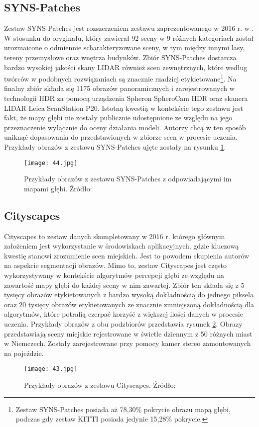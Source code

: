 \subsection{SYNS-Patches}
Zestaw SYNS-Patches \cite{spencer2022deconstructing} jest rozszerzeniem zestawu zaprezentowanego w 2016 r. w \cite{adams2016syns}. W stosunku do oryginału, który zawierał 92 sceny w 9 różnych kategoriach został urozmaicone o odmiennie scharakteryzowane sceny, w tym między innymi lasy, tereny przemysłowe oraz wnętrza budynków. Zbiór SYNS-Patches dostarcza bardzo wysokiej jakości skany LIDAR również scen zewnętrznych, które według twórców w podobnych rozwiązaniach są znacznie rzadziej etykietowane\footnote{Zestaw SYNS-Patches posiada aż 78,30\% pokrycie obrazu mapą głębi, podczas gdy zestaw KITTI posiada jedynie 15,28\% pokrycie.}. Na finalny zbiór składa się 1175 obrazów panoramicznych i zarejestrowanych w technologii HDR za pomocą urządzenia Spheron SpheroCam HDR oraz skanera LIDAR Leica ScanStation P20. Istotną kwestią w kontekście tego zestawu jest fakt, że mapy głębi nie zostały publicznie udostępnione ze względu na jego przeznaczenie wyłącznie do oceny działania modeli. Autorzy chcą w ten sposób uniknąć dopasowania do przedstawionych w zbiorze scen w procesie uczenia. Przykłady obrazów z zestawu SYNS-Patches ujęte zostały na rysunku \ref{fig:syns-example}.
\begin{figure}[H]
    \centering
    \texttt{[image: 44.jpg]}
    \caption{Przykłady obrazów z zestawu SYNS-Patches z odpowiadającymi im mapami głębi. Źródło: \cite{spencer2022deconstructing}}
    \label{fig:syns-example}
\end{figure}

\subsection{Cityscapes}
Cityscapes \cite{cordts2016cityscapes} to zestaw danych skompletowany w 2016 r. którego głównym założeniem jest wykorzystanie w środowiskach aplikacyjnych, gdzie kluczową kwestię stanowi zrozumienie scen miejskich. Jest to powodem skupienia autorów na aspekcie segmentacji obrazów. Mimo to, zestaw Cityscapes jest często wykorzystywany w kontekście algorytmów percepcji głębi ze względu na zawartość mapy głębi do każdej sceny w nim zawartej. Zbiór ten składa się z 5 tysięcy obrazów etykietowanych z bardzo wysoką dokładnością do jednego piksela oraz 20 tysięcy obrazów etykietowanych ze znacznie zmniejszoną dokładnością dla algorytmów, które potrafią czerpać korzyść z większej ilości danych w procesie uczenia. Przykłady obrazów z obu podzbiorów przedstawia rysunek \ref{fig:cityscapes-example}. Obrazy przedstawiają sceny miejskie rejestrowane w świetle dziennym z 50 różnych miast w Niemczech. Zostały zarejestrowane przy pomocy kamer stereo zamontowanych na pojeździe.
\begin{figure}[H]
    \centering
    \texttt{[image: 43.jpg]}
    \caption{Przykłady obrazów z zestawu Cityscapes. Źródło: \cite{cordts2016cityscapes}}
    \label{fig:cityscapes-example}
\end{figure}

